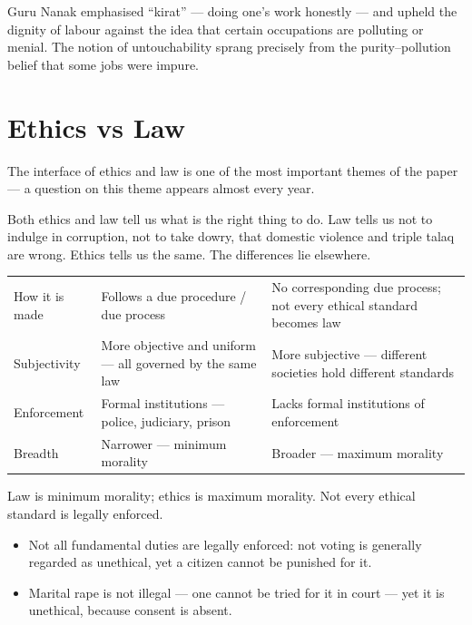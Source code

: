 \begin{GovtPolicy}
Guru Nanak emphasised ``kirat'' --- doing one's work honestly --- and upheld the dignity of labour against the idea that certain occupations are polluting or menial. The notion of untouchability sprang precisely from the purity--pollution belief that some jobs were impure.
\end{GovtPolicy}

\section{Ethics vs Law}

\begin{PYQLink}
The interface of ethics and law is one of the most important themes of the paper --- a question on this theme appears almost every year.
\end{PYQLink}

Both ethics and law tell us what is the right thing to do. Law tells us not to indulge in corruption, not to take dowry, that domestic violence and triple talaq are wrong. Ethics tells us the same. The differences lie elsewhere.

\begin{center}
\begin{tabularx}{\textwidth}{>{\raggedright\arraybackslash}p{2.6cm} Y Y}
 &  &  \\
\toprule
How it is made & Follows a due procedure / due process & No corresponding due process; not every ethical standard becomes law \\
Subjectivity & More objective and uniform --- all governed by the same law & More subjective --- different societies hold different standards \\
Enforcement & Formal institutions --- police, judiciary, prison & Lacks formal institutions of enforcement \\
Breadth & Narrower --- minimum morality & Broader --- maximum morality \\
\bottomrule
\end{tabularx}
\end{center}

\begin{KeyConcept}
Law is minimum morality; ethics is maximum morality. Not every ethical standard is legally enforced.
\end{KeyConcept}

\begin{ExampleBox}
\begin{itemize}
\item Not all fundamental duties are legally enforced: not voting is generally regarded as unethical, yet a citizen cannot be punished for it.
\item Marital rape is not illegal --- one cannot be tried for it in court --- yet it is unethical, because consent is absent.
\end{itemize}
\end{ExampleBox}


